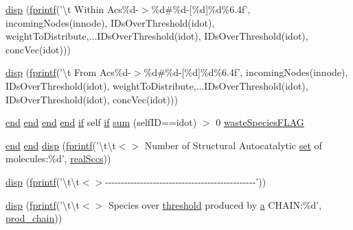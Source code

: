 \begin{DoxyCompactItemize}
\hyperlink{a00028_a2966730036d0549661e4d262b15beaf9}{disp} (\hyperlink{a00110_aa6dc40efe43a338c9ff278260d95b4d9}{fprintf}('\textbackslash{}t Within Acs\%d-\/$>$\%d\#\%d-\/\mbox{[}\%d\mbox{]}\%d\%6.\-4f', incoming\-Nodes(innode), I\-Ds\-Over\-Threshold(idot), weight\-To\-Distribute,...\-I\-Ds\-Over\-Threshold(idot), I\-Ds\-Over\-Threshold(idot), conc\-Vec(idot)))
\item 
\hyperlink{a00028_a5f7c41b053ae4e4e6df81041800ed0c1}{disp} (\hyperlink{a00110_aa6dc40efe43a338c9ff278260d95b4d9}{fprintf}('\textbackslash{}t From Acs\%d-\/$>$\%d\#\%d-\/\mbox{[}\%d\mbox{]}\%d\%6.\-4f', incoming\-Nodes(innode), I\-Ds\-Over\-Threshold(idot), weight\-To\-Distribute,...\-I\-Ds\-Over\-Threshold(idot), I\-Ds\-Over\-Threshold(idot), conc\-Vec(idot)))
\item 
\hyperlink{a00025_afb358f48b1646c750fb9da6c6585be2b}{end} \hyperlink{a00025_afb358f48b1646c750fb9da6c6585be2b}{end} \hyperlink{a00025_afb358f48b1646c750fb9da6c6585be2b}{end} \hyperlink{a00025_afb358f48b1646c750fb9da6c6585be2b}{end} \hyperlink{a00030_a01d55766b8058903dd360b4bda71f9f5}{if} self \hyperlink{a00030_a01d55766b8058903dd360b4bda71f9f5}{if} \hyperlink{a00028_a5330c3728d2e8d052841f1bbf8d33845}{sum} (self\-I\-D==idot) $>$ 0 \hyperlink{a00028_a86a34d23ef767cc82038231f868cea96}{waste\-Species\-F\-L\-A\-G}
\item 
\hyperlink{a00025_afb358f48b1646c750fb9da6c6585be2b}{end} \hyperlink{a00025_afb358f48b1646c750fb9da6c6585be2b}{end} \hyperlink{a00028_a00d6c60332efc3d721036c6f8283fa9b}{disp} (\hyperlink{a00110_aa6dc40efe43a338c9ff278260d95b4d9}{fprintf}('\textbackslash{}t\textbackslash{}t$<$$>$ Number of Structural Autocatalytic \hyperlink{a00028_ab178d77fe9330d344e5b21984e6dfd70}{set} of molecules\-:\%d', \hyperlink{a00028_a135a83e607075aa815c72f1ec0cbbc5a}{real\-Sccs}))
\item 
\hyperlink{a00028_afb873ef090cc25caaad4390f3b7bd082}{disp} (\hyperlink{a00110_aa6dc40efe43a338c9ff278260d95b4d9}{fprintf}('\textbackslash{}t\textbackslash{}t$<$$>$-\/-\/-\/-\/-\/-\/-\/-\/-\/-\/-\/-\/-\/-\/-\/-\/-\/-\/-\/-\/-\/-\/-\/-\/-\/-\/-\/-\/-\/-\/-\/-\/-\/-\/-\/-\/-\/-\/-\/-\/-\/-\/-\/-\/-\/-\/-\/'))
\item 
\hyperlink{a00028_a5fac2e70291daf3041076fa0a3db8d59}{disp} (\hyperlink{a00110_aa6dc40efe43a338c9ff278260d95b4d9}{fprintf}('\textbackslash{}t\textbackslash{}t$<$$>$ Species over \hyperlink{a00036_aa022cbb28f80299d572def08e7a5ccfd}{threshold} produced by \hyperlink{a00035_a2ffdbad9ea59541e59cbd2b938e0770c}{a} C\-H\-A\-I\-N\-:\%d', \hyperlink{a00028_ae0bd6421b7c81047a5234aeeb707efc4}{prod\-\_\-chain}))
$$
\end{DoxyCompactItemize}
